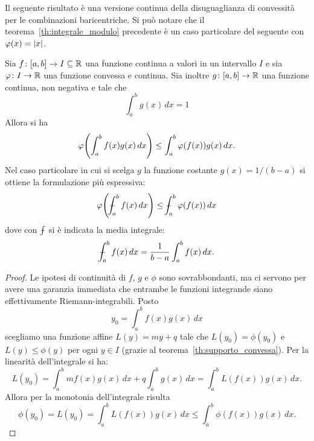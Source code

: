 Il seguente risultato è una versione continua della disuguaglianza di convessità 
per le combinazioni baricentriche.
Si può notare che il teorema~\ref{th:integrale_modulo} precedente è un caso particolare 
del seguente con $\varphi(x)={\left|x\right|}$.
%
\begin{theorem}
  \label{th:jensen}%
Sia $f\colon[a,b]\to I\subseteq {\mathbb R}$ una funzione continua a valori 
in un intervallo $I$ e sia $\varphi\colon I \to {\mathbb R}$ una funzione convessa e continua.
Sia inoltre $g\colon [a,b]\to {\mathbb R}$ una funzione continua,
non negativa e tale che 
\[
    \int_a^b g(x)\, dx = 1
\]
Allora si ha 
  \[
  \varphi{\left( \int_a^b f(x) g(x) \, dx \right)} \le \int_a^b \varphi(f(x)) g(x)\, dx.
  \]
Nel caso particolare in cui si scelga $g$ la funzione costante $g(x)=1/(b-a)$ si ottiene 
la formulazione più espressiva:
\[
  \phi\enclose{\dashint_a^b f(x)\, dx} \le \dashint_a^b \phi(f(x))\, dx
\]
dove con $\dashint$ si è indicata la media integrale:
\[
  \dashint_a^b f(x)\, dx = \frac{1}{b-a} \int_a^b f(x)\, dx.
\]
\end{theorem}
%
\begin{proof}
Le ipotesi di continuità di $f$, $g$ e $\phi$ sono sovrabbondanti, ma ci servono 
per avere una garanzia immediata che entrambe le funzioni integrande
siano effettivamente Riemann-integrabili.
Posto 
\[
  y_0 = \int_a^b f(x) g(x)\, dx 
\]
scegliamo una funzione affine $L(y) = my + q$ tale che $L(y_0)=\phi(y_0)$ 
e $L(y)\le \phi(y)$ per ogni $y\in I$ (grazie al teorema~\ref{th:supporto_convessa}).
Per la linearità dell'integrale si ha: 
\[
  L(y_0)
  = \int_a^b mf(x)g(x)\, dx + q \int_a^b g(x)\, dx
  = \int_a^b L(f(x)) g(x)\, dx.
\]
Allora per la monotonia dell'integrale risulta
\[
  \phi(y_0) = L(y_0) = \int_a^b L(f(x)) g(x)\, dx \le \int_a^b \phi(f(x)) g(x)\, dx.
\]
\end{proof}
    

